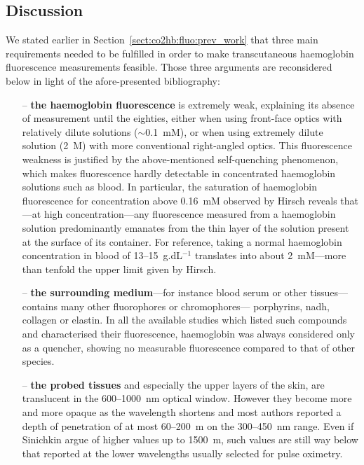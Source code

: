 \subsection{Discussion}

We stated earlier in Section~\ref{sect:co2hb:fluo:prev_work} that three main requirements needed to be fulfilled in order to make transcutaneous haemoglobin fluorescence measurements feasible. Those three arguments are reconsidered below in light of the afore-presented bibliography:

\begin{itemize}
	\item[--] \textbf{the haemoglobin fluorescence} is extremely weak, explaining its absence of measurement until the eighties, either when using front-face optics with relatively dilute solutions ($\sim$0.1~mM)\cite{hirsch1980}, or when using extremely dilute solution (2~\textmu{}M) with more conventional right-angled optics\cite{alpert1980}. This fluorescence weakness is justified by the above-mentioned self-quenching phenomenon, which makes fluorescence hardly detectable in concentrated haemoglobin solutions such as blood. In particular, the saturation of haemoglobin fluorescence for concentration above 0.16~mM observed by Hirsch \etal{}\cite{hirsch1980} reveals that---at high concentration---any fluorescence measured from a haemoglobin solution predominantly emanates from the thin layer of the solution present at the surface of its container. For reference, taking a normal haemoglobin concentration in blood of 13--15~g.dL$^{-1}$\cite{us_hematological2005} translates into about 2~mM---more than tenfold the upper limit given by Hirsch.
	\item[--] \textbf{the surrounding medium}---for instance blood serum or other tissues---contains many other fluorophores or chromophores---\eg{} porphyrins, \gls{nadh}, collagen or elastin. In all the available studies which listed such compounds and characterised their fluorescence, haemoglobin was always considered only as a quencher, showing no measurable fluorescence compared to that of other species\cite{wolfbeis1985, wagnieres1998, kollias2002, vishwanath2011}.
	\item[--] \textbf{the probed tissues} and especially the upper layers of the skin, are translucent in the 600--1000~nm optical window. However they become more and more opaque as the wavelength shortens and most authors reported a depth of penetration of at most 60--200~\textmu{}m on the 300--450~nm range\cite{bruls1984, gmitro1988, koenig1998, barun2007, young1997}. Even if Sinichkin \etal{} argue of higher values up to 1500~\textmu{}m\cite{sinichkin1998}, such values are still way below that reported at the lower wavelengths usually selected for pulse oximetry.
\end{itemize}

